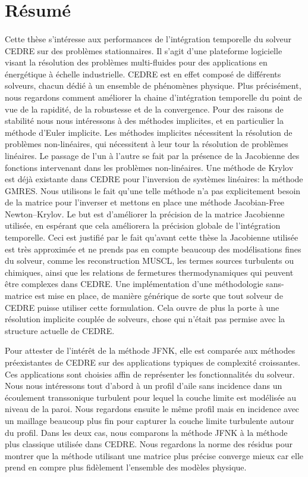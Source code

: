 \section{Résumé}

\paragraph{}
Cette thèse s'intéresse aux performances de l'intégration temporelle du solveur CEDRE sur des problèmes stationnaires.
Il s'agit d'une plateforme logicielle visant la résolution des problèmes multi-fluides pour des applications en énergétique à échelle industrielle.
CEDRE est en effet composé de différents solveurs, chacun dédié à un ensemble de phénomènes physique.
Plus précisément, nous regardons comment améliorer la chaine d’intégration temporelle du point de vue de la rapidité, de la robustesse et de la convergence.
Pour des raisons de stabilité nous nous intéressons à des méthodes implicites, et en particulier la méthode d'Euler implicite.
Les méthodes implicites nécessitent la résolution de problèmes non-linéaires, qui nécessitent à leur tour la résolution de problèmes linéaires.
Le passage de l'un à l'autre se fait par la présence de la Jacobienne des fonctions intervenant dans les problèmes non-linéaires.
Une méthode de Krylov est déjà existante dans CEDRE pour l'inversion de systèmes linéaires: la méthode GMRES.
Nous utilisons le fait qu'une telle méthode n'a pas explicitement besoin de la matrice pour l'inverser et mettons en place une méthode Jacobian-Free Newton--Krylov.
Le but est d'améliorer la précision de la matrice Jacobienne utilisée, en espérant que cela améliorera la précision globale de l'intégration temporelle.
Ceci est justifié par le fait qu'avant cette thèse la Jacobienne utilisée est très approximée et ne prends pas en compte beaucoup des modélisations fines du solveur, comme les reconstruction MUSCL, les termes sources turbulents ou chimiques, ainsi que les relations de fermetures thermodynamiques qui peuvent être complexes dans CEDRE.
Une implémentation d'une méthodologie sans-matrice est mise en place, de manière générique de sorte que tout solveur de CEDRE puisse utiliser cette formulation.
Cela ouvre de plus la porte à une résolution implicite couplée de solveurs, chose qui n'était pas permise avec la structure actuelle de CEDRE.

Pour attester de l’intérêt de la méthode JFNK, elle est comparée aux méthodes préexistantes de CEDRE sur des applications typiques de complexité croissantes.
Ces applications sont choisies affin de représenter les fonctionnalités du solveur.
Nous nous intéressons tout d'abord à un profil d'aile sans incidence dans un écoulement transsonique turbulent pour lequel la couche limite est modélisée au niveau de la paroi.
Nous regardons ensuite le même profil mais en incidence avec un maillage beaucoup plus fin pour capturer la couche limite turbulente autour du profil.
Dans les deux cas, nous comparons la méthode JFNK à la méthode plus classique utilisée dans CEDRE.
Nous regardons la norme des résidus pour montrer que la méthode utilisant une matrice plus précise converge mieux car elle prend en compre plus fidèlement l'ensemble des modèles physique.

